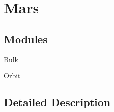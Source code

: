 \hypertarget{group___e_g_x_phys-_constants-_astrophysics-_solar_system-_mars}{}\section{Mars}
\label{group___e_g_x_phys-_constants-_astrophysics-_solar_system-_mars}
\subsection*{Modules}
\begin{DoxyCompactItemize}
\item 
\mbox{\hyperlink{group___e_g_x_phys-_constants-_astrophysics-_solar_system-_mars-_bulk}{Bulk}}
\item 
\mbox{\hyperlink{group___e_g_x_phys-_constants-_astrophysics-_solar_system-_mars-_orbit}{Orbit}}
\end{DoxyCompactItemize}


\subsection{Detailed Description}
